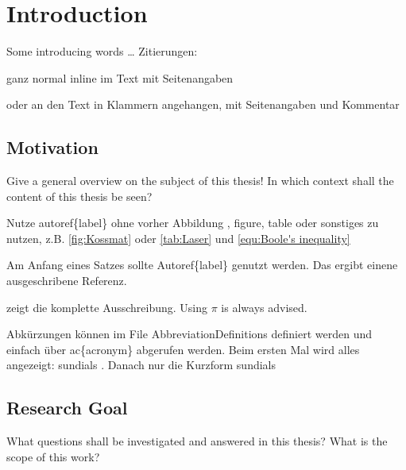 \chapter{Introduction}
\authorAmSa
Some introducing words \dots
Zitierungen:

ganz normal inline im Text mit Seitenangaben \cite[6]{franke17}

oder an den Text in Klammern angehangen, mit Seitenangaben und Kommentar \autocites(see also his earlier work)[347-348]{franke17}


\section{Motivation}
Give a general overview on the subject of this thesis! In which context shall the content of this thesis  be seen? 

Nutze autoref\{label\} ohne vorher Abbildung , figure, table oder sonstiges zu nutzen, z.B. \autoref{fig:Kossmat} oder \autoref{tab:Laser} und \autoref{equ:Boole's inequality} 

Am Anfang eines Satzes sollte Autoref\{label\} genutzt werden. Das ergibt einene ausgeschribene Referenz.

 zeigt die komplette Ausschreibung. Using $\pi$ is always advised.

Abkürzungen können im File AbbreviationDefinitions definiert werden und einfach über ac\{acronym\} abgerufen werden. Beim ersten Mal wird alles angezeigt: \ac{sundials} . Danach nur die Kurzform \ac{sundials}

\section{Research Goal}
What questions shall be investigated and answered in this thesis? What is the scope of this work?
